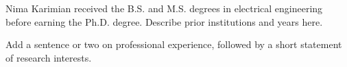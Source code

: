 %
%

Nima Karimian received the B.S. and M.S. degrees in electrical engineering
before earning the Ph.D. degree. Describe prior institutions and years here.

Add a sentence or two on professional experience, followed by a short
statement of research interests.
